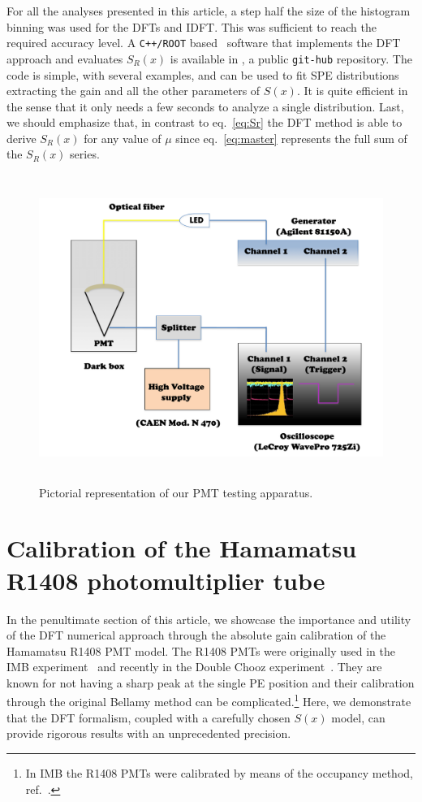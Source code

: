\documentclass[a4paper,11pt]{article}
\begin{document}
For all the analyses presented in this article, a step half the size of the histogram binning was used for the DFTs and IDFT. 
This was sufficient to reach the required accuracy level. 
A \texttt{C++/ROOT} based~\cite{root} software that implements the DFT approach and evaluates $S_R(x)$ is available in \cite{git}, a public \texttt{git-hub} repository.
The code is simple, with several examples, and can be used to fit SPE distributions extracting the gain and all the other parameters of $S(x)$. 
It is quite efficient in the sense that it only needs a few seconds to analyze a single distribution.  
Last, we should emphasize that, in contrast to eq.~\eqref{eq:Sr} the DFT method is able to derive $S_R(x)$ for any value of $\mu$ since eq.~\eqref{eq:master} represents the full sum of the $S_R(x)$ series. 


\begin{figure}[!t]
\centering
\includegraphics[width=13.2cm, height=10.0cm]{figures/setup.pdf} 
\caption{Pictorial representation of our PMT testing apparatus.}
\label{fig:setup}
\end{figure}

\section{Calibration of the Hamamatsu R1408 photomultiplier tube}
\label{sec:results}
%

In the penultimate section of this article, we showcase the importance and utility of the DFT numerical approach through the absolute gain calibration of the Hamamatsu R1408 PMT model. 
The R1408 PMTs were originally used in the IMB experiment~\cite{IMB} and recently in the Double Chooz experiment~\cite{DC}. 
They are known for not having a sharp peak at the single PE position and their calibration through the original Bellamy method can be complicated.\footnote{%
In IMB the R1408 PMTs were calibrated by means of the occupancy method, ref.~\cite{IMBcalib}. }
Here, we demonstrate that the DFT formalism, coupled with a carefully chosen  $S(x)$ model, can provide rigorous results with an unprecedented precision. 
\end{document}
